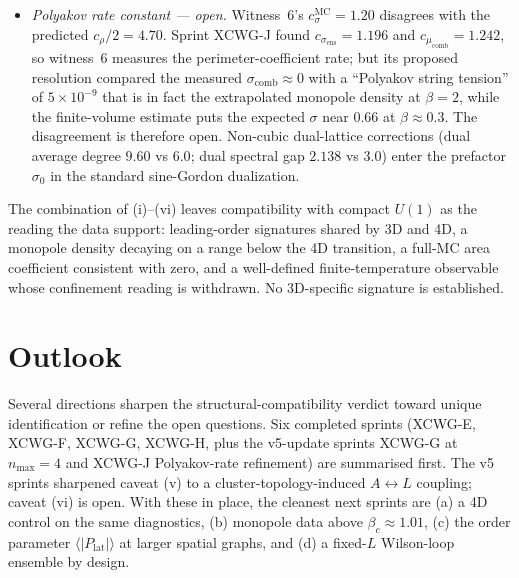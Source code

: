 \documentclass[11pt]{article}
\begin{document}
\begin{itemize}
\item[(vi)] \emph{Polyakov rate constant --- open.} Witness~6's
$c_\sigma^\text{MC}=1.20$ disagrees with the predicted $c_\rho/2=4.70$.  Sprint
XCWG-J found $c_{\sigma_\text{ens}}=1.196$ and $c_{\mu_\text{comb}}=1.242$, so
witness~6 measures the perimeter-coefficient rate; but its proposed
resolution compared the measured $\sigma_\text{comb}\approx 0$ with a
``Polyakov string tension'' of $5\times 10^{-9}$ that is in fact the
extrapolated monopole density at $\beta = 2$, while the finite-volume
estimate puts the expected $\sigma$ near $0.66$ at $\beta \approx 0.3$.  The
disagreement is therefore open.  Non-cubic dual-lattice corrections (dual
average degree $9.60$ vs $6.0$; dual spectral gap $2.138$ vs $3.0$) enter the
prefactor $\sigma_0$ in the standard sine-Gordon dualization.
\end{itemize}

The combination of (i)--(vi) leaves compatibility with compact $U(1)$ as the
reading the data support: leading-order signatures shared by 3D and 4D, a
monopole density decaying on a range below the 4D transition, a full-MC
area coefficient consistent with zero, and a well-defined finite-temperature
observable whose confinement reading is withdrawn.  No 3D-specific
signature is established.

\section{Outlook}
\label{sec:outlook}

Several directions sharpen the structural-compatibility verdict toward unique
identification or refine the open questions. Six completed sprints
(XCWG-E, XCWG-F, XCWG-G, XCWG-H, plus the v5-update sprints XCWG-G at
$n_\text{max}=4$ and XCWG-J Polyakov-rate refinement) are summarised first.
The v5 sprints sharpened caveat (v) to a cluster-topology-induced
$A\leftrightarrow L$ coupling; caveat (vi) is open. With these
in place, the cleanest next sprints are (a) a 4D control on the same
diagnostics, (b) monopole data above $\beta_c \approx 1.01$, (c) the order
parameter $\langle |P_\text{lat}|\rangle$ at larger spatial graphs, and (d) a
fixed-$L$ Wilson-loop ensemble by design.
\end{document}
